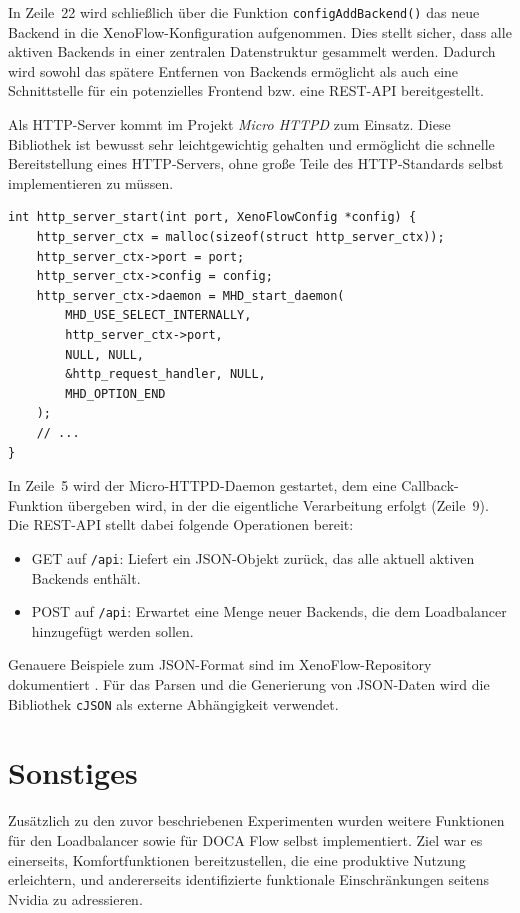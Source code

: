 \documentclass[paper=a4, fontsize=11pt]{scrartcl} %
\numberwithin{equation}{section} %
\numberwithin{figure}{section} %
\numberwithin{table}{section} %
\begin{document}
In Zeile~22 wird schließlich über die Funktion \texttt{configAddBackend()} das neue Backend in die XenoFlow-Konfiguration aufgenommen. Dies stellt sicher, dass alle aktiven Backends in einer zentralen Datenstruktur gesammelt werden. Dadurch wird sowohl das spätere Entfernen von Backends ermöglicht als auch eine Schnittstelle für ein potenzielles Frontend bzw. eine REST-API bereitgestellt.

Als HTTP-Server kommt im Projekt \textit{Micro HTTPD} zum Einsatz. Diese Bibliothek ist bewusst sehr leichtgewichtig gehalten und ermöglicht die schnelle Bereitstellung eines HTTP-Servers, ohne große Teile des HTTP-Standards selbst implementieren zu müssen.
\begin{verbatim}
int http_server_start(int port, XenoFlowConfig *config) {
    http_server_ctx = malloc(sizeof(struct http_server_ctx));    
    http_server_ctx->port = port;
    http_server_ctx->config = config;
    http_server_ctx->daemon = MHD_start_daemon(
        MHD_USE_SELECT_INTERNALLY,
        http_server_ctx->port,
        NULL, NULL,
        &http_request_handler, NULL,
        MHD_OPTION_END
    );
    // ... 
}
\end{verbatim}
In Zeile~5 wird der Micro-HTTPD-Daemon gestartet, dem eine Callback-Funktion übergeben wird, in der die eigentliche Verarbeitung erfolgt (Zeile~9). Die REST-API stellt dabei folgende Operationen bereit:

\begin{itemize}
\item GET auf \texttt{/api}: Liefert ein JSON-Objekt zurück, das alle aktuell aktiven Backends enthält.
\item POST auf \texttt{/api}: Erwartet eine Menge neuer Backends, die dem Loadbalancer hinzugefügt werden sollen.
\end{itemize}

Genauere Beispiele zum JSON-Format sind im XenoFlow-Repository dokumentiert \cite{heimbrodt2025xenoflow}. Für das Parsen und die Generierung von JSON-Daten wird die Bibliothek \texttt{cJSON} als externe Abhängigkeit verwendet.
\section{Sonstiges}
Zusätzlich zu den zuvor beschriebenen Experimenten wurden weitere Funktionen für den Loadbalancer sowie für DOCA Flow selbst implementiert. Ziel war es einerseits, Komfortfunktionen bereitzustellen, die eine produktive Nutzung erleichtern, und andererseits identifizierte funktionale Einschränkungen seitens Nvidia zu adressieren.
\end{document}
